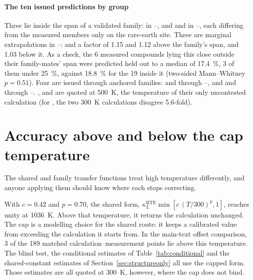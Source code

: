 \documentclass[preprint, 12pt]{elsarticle}
\begin{document}
\paragraph{The ten issued predictions by group} Three lie inside the span of a validated family:
 in --, and  and  in --, each
differing from the measured members only on the rare-earth site. Three are marginal extrapolations
in --:  and  a factor of \num{1.15} and \num{1.12} above the
family's span, and  \num{1.03} below it. As a check, the \num{6} measured compounds
lying this close outside their family-mates' span were predicted held out to a median of
\SI{17.4}{\percent}, \num{3} of them under \SI{25}{\percent}, against \SI{18.8}{\percent} for the
\num{19} inside it (two-sided Mann--Whitney $p=\num{0.51}$). Four are issued through anchored
families:  and  through --, and  and 
through --. ,  and  are quoted at
\SI{500}{\kelvin}, the temperature of their only uncontested calculation (for , the two
\SI{300}{\kelvin} calculations disagree \num{5.6}-fold).

\section{Accuracy above and below the cap temperature}
\label{sec:cap}

The shared and family transfer functions treat high temperature differently, and anyone applying
them should know where each stops correcting.

With $c=\num{0.42}$ and $p=\num{0.70}$, the shared form,
$\kappa_L^{\mathrm{BTE}}\min[c\,(T/300)^{p},1]$, reaches unity at \SI{1036}{\kelvin}. Above that
temperature, it returns the calculation unchanged. The cap is a modelling choice for the shared
route: it keeps a calibrated value from exceeding the calculation it starts from. In the main-text
offset comparison, \num{3} of the \num{189} matched calculation--measurement points lie above this
temperature. The blind test, the conditional estimates of Table~\ref{tab:conditional} and the
shared-constant estimates of Section~\ref{sec:structureonly} all use the capped form. Those estimates are all quoted at \SI{300}{\kelvin}, however, where the cap does not
bind.
\end{document}

